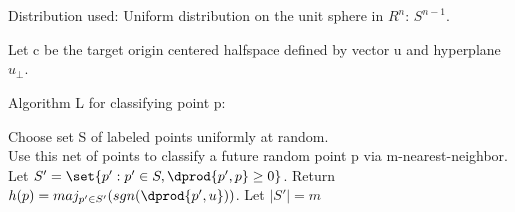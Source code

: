 \documentclass[10pt]{amsart}
\theoremstyle{remark}
\begin{document}
\section{}
Distribution used: Uniform distribution on the unit sphere in $R^{n}$: $S^{n-1}$.

Let c be the target origin centered halfspace defined by vector u and hyperplane $u_{\perp}$.

Algorithm L for classifying point p:

\begin{algorithm}
Choose set S of labeled points uniformly at random.\\
Use this net of points to classify a future random point p via m-nearest-neighbor. Let $S' = \set{p': p'\in S, \dprod{p',p} \geq 0}$. Return $h(p) = maj_{p' \in S'} (sgn(\dprod{p',u}))$. Let $|S'| = m$ \\
\end{algorithm}
\end{document}
